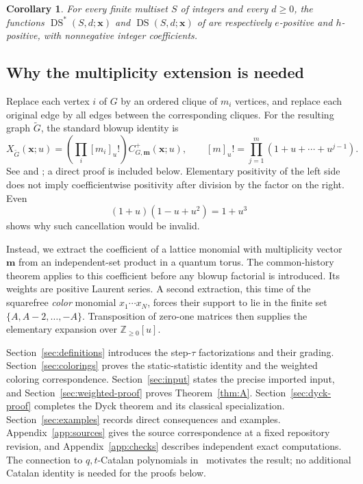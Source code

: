 \documentclass[11pt,reqno]{amsart}
\newcommand{\xx}{\mathbf x}
\newcommand{\mm}{\mathbf m}
\newcommand{\DS}{\operatorname{DS}}
\newtheorem{corollary}[theorem]{Corollary}
\theoremstyle{definition}
\theoremstyle{remark}
\numberwithin{equation}{section}
\begin{document}
\begin{corollary}\label{cor:classical-intro}
For every finite multiset $S$ of integers and every $d\geq0$, the functions
$\DS^*(S,d;\xx)$ and $\DS(S,d;\xx)$ of
\cite[Definition~2.5]{Hawkes2026} are respectively $e$-positive and
$h$-positive, with nonnegative integer coefficients.
\end{corollary}

\subsection{Why the multiplicity extension is needed}
Replace each vertex $i$ of $G$ by an ordered clique of $m_i$ vertices,
and replace each original edge by all edges between the corresponding
cliques.  For the resulting graph $\widetilde G$, the standard blowup
identity is
\begin{equation}\label{eq:blowup-intro}
 X_{\widetilde G}(\xx;u)
    =\left(\prod_i[m_i]_u!\right)C^+_{G,\mm}(\xx;u),
 \qquad [m]_u!=\prod_{j=1}^m(1+u+\cdots+u^{j-1}).
\end{equation}
See \cite{Hwang2024} and \cite[Remark~4.4 and (4.3)]{KiemLee2024};
a direct proof is included below.  Elementary positivity of the left
side does not imply coefficientwise positivity after division by the
factor on the right.  Even
\[
 (1+u)(1-u+u^2)=1+u^3
\]
shows why such cancellation would be invalid.

Instead, we extract the coefficient of a lattice monomial with
multiplicity vector $\mm$ from an independent-set product in a quantum
torus.  The common-history theorem applies to this coefficient before
any blowup factorial is introduced.  Its weights are positive Laurent
series.  A second extraction, this time of the squarefree \emph{color}
monomial $x_1\cdots x_N$, forces their support to lie in the finite set
$\{A,A-2,\ldots,-A\}$.  Transposition of zero-one matrices then supplies
the elementary expansion over $\mathbb Z_{\geq0}[u]$.

Section~\ref{sec:definitions} introduces the step-$\tau$ factorizations
and their grading.  Section~\ref{sec:colorings} proves the static-statistic
identity and the weighted coloring correspondence.  Section~\ref{sec:input} states the precise imported input, and
Section~\ref{sec:weighted-proof} proves Theorem~\ref{thm:A}.
Section~\ref{sec:dyck-proof} completes the Dyck theorem and its classical
specialization.  Section~\ref{sec:examples} records direct consequences
and examples.  Appendix~\ref{app:sources} gives the source correspondence
at a fixed repository revision, and Appendix~\ref{app:checks} describes
independent exact computations.  The connection to $q,t$-Catalan
polynomials in~\cite{Hawkes2026} motivates the result; no additional
Catalan identity is needed for the proofs below.
\end{document}
